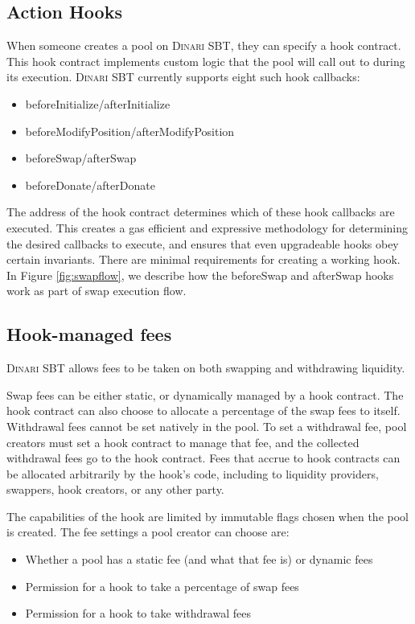 \documentclass[sigconf,nonacm,prologue,table]{acmart}
\numberwithin{equation}{section}
\theoremstyle{definition}
\theoremstyle{remark}
\begin{document}
\subsection{Action Hooks} \label{actionhooks}

When someone creates a pool on \textsc{Dinari SBT}, they can specify a hook contract. This hook contract implements custom logic that the pool will call out to during its execution. 
\textsc{Dinari SBT} currently supports eight such hook callbacks:

\begin{itemize}
\item beforeInitialize/afterInitialize
\item beforeModifyPosition/afterModifyPosition
\item beforeSwap/afterSwap
\item beforeDonate/afterDonate
\end{itemize}

The address of the hook contract determines which of these hook callbacks are executed. This creates a gas efficient and expressive methodology for determining the desired callbacks to execute, and ensures that even upgradeable hooks obey certain invariants. There are minimal requirements for creating a working hook. In Figure \ref{fig:swapflow}, we describe how the beforeSwap and afterSwap hooks work as part of swap execution flow.

\subsection{Hook-managed fees} \label{hookfees}

\textsc{Dinari SBT} allows fees to be taken on both swapping and withdrawing liquidity. 

Swap fees can be either static, or dynamically managed by a hook contract. The hook contract can also choose to allocate a percentage of the swap fees to itself. Withdrawal fees cannot be set natively in the pool. To set a withdrawal fee, pool creators must set a hook contract to manage that fee, and the collected withdrawal fees go to the hook contract. Fees that accrue to hook contracts can be allocated arbitrarily by the hook’s code, including to liquidity providers, swappers, hook creators, or any other party. 

The capabilities of the hook are limited by immutable flags chosen when the pool is created. The fee settings a pool creator can choose are:
\begin{itemize}
    \item Whether a pool has a static fee (and what that fee is) or dynamic fees
    \item Permission for a hook to take a percentage of swap fees 
    \item Permission for a hook to take withdrawal fees
\end{itemize}
\end{document}
